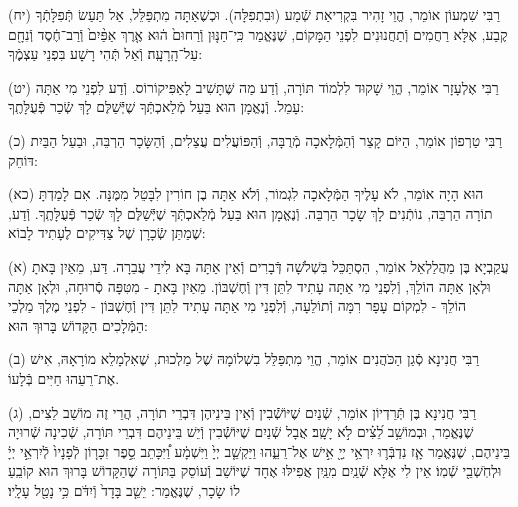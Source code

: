 \documentclass[twoside, openany, parskip=half, 11pt]{book}
\begin{document}
(יח)
רַבִּי שִׁמְעוֹן אוֹמֵר, הֱוֵי זָהִיר בִּקְרִיאַת שְֿׁמַע (וּבִתְפִלָּה). וּכְשֶׁאַתָּה מִתְפַּלֵּל, אַל תַּעַשׂ תְּֿפִלָּתְֿךָ קֶבַע, אֶלָּא רַחֲמִים וְֿתַחֲנוּנִים לִפְנֵי הַמָּקוֹם, שֶׁנֶּאֱמַר כִּֽי־חַנּ֤וּן וְֿרַחוּם֙ ה֔וּא אֶ֤רֶךְ אַפַּ֨יִם֙ וְֿרַב־חֶ֔סֶד וְֿנִחָ֖ם עַל־הָֽרָעָֽה׃ וְֿאַל תְּֿהִי רָשָׁע בִּפְנֵי עַצְמֶֽֿךָ:

(יט)
רַבִּי אֶלְעָזָר אוֹמֵר, הֱוֵי שָׁקוּד לִלְמוֹד תּוֹרָה, וְֿדַע מַה שֶּׁתָּשִׁיב לָאַפִּיקוֹרוֹס. וְֿדַע לִפְנֵי מִי אַתָּה עָמֵל. וְֿנֶאֱמָן הוּא בַּעַל מְֿלַאכְתְּֿךָ שֶׁיְּֿֿשַׁלֶּם לָךְ שְֿׂכַר פְּֿעֻלָּתֶֽךָ:


(כ)
רַבִּי טַרְפוֹן אוֹמֵר, הַיּוֹם קָצֵר וְֿהַמְּֿלָאכָה מְֿרֻבָּה, וְֿהַפּוֹעֲלִים עֲצֵלִים, וְֿהַשָּׂכָר הַרְבֵּה, וּבַעַל הַבַּיִת דּוֹחֵק:

(כא) הוּא הָיָה אוֹמֵר, לֹא עָלֶיךָ הַמְּֿלָאכָה לִגְמוֹר, וְֿלֹא אַתָּה בֶן חוֹרִין לִבָּטֵל מִמֶּנָּה. אִם לָמַדְתָּ תוֹרָה הַרְבֵּה, נוֹתְֿנִים לָךְ שָׂכָר הַרְבֵּה. וְֿנֶאֱמָן הוּא בַּעַל מְֿלַאכְתְּֿךָ שֶׁיְּֿֿשַׁלֶּם לָךְ שְֿׂכַר פְּֿעֻלָּתֶֽךָ. וְֿדַע, שֶׁמַתַּן שְֿׂכָרָן שֶׁל צַדִּיקִים לֶעָתִיד לָבוֹא:


\kolyisroel

(א)
עֲקַבְיָא בֶּן מַהֲלַלְאֵל אוֹמֵר, הִסְתַּכֵּל בִּשְׁלֹשָׁה דְּֿבָרִים וְֿאֵין אַתָּה בָּא לִידֵי עֲבֵרָה. דַּע, מֵאַיִן בָּאתָ וּלְאָן אַתָּה הוֹלֵךְ, וְֿלִפְנֵי מִי אַתָּה עָתִיד לִתֵּן דִּין וְֿחֶשְׁבּוֹן.
מֵאַיִן בָּאתָ - מִטִּפָּה סְֿרוּחָה,
וּלְאָן אַתָּה הוֹלֵךְ - לִמְקוֹם עָפָר רִמָּה וְֿתוֹלֵעָה,
וְֿלִפְנֵי מִי אַתָּה עָתִיד לִתֵּן דִּין וְֿחֶשְׁבּוֹן - לִפְנֵי מֶלֶךְ מַלְכֵי הַמְּֿלָכִים הַקָּדוֹשׁ בָּרוּךְ הוּא:

(ב)
רַבִּי חֲנִינָא סְֿגַן הַכֹּהֲנִים אוֹמֵר, הֱוֵי מִתְפַּלֵּל בִשְׁלוֹמָהּ שֶׁל מַלְכוּת, שֶׁאִלְמָלֵא מוֹרָאָהּ, אִישׁ אֶת־רֵעֵהוּ חַיִּים בְּֿלָעוֹ.

(ג)
רַבִּי חֲנִינָא בֶּן תְּֿרַדְיוֹן אוֹמֵר, שְֿׁנַיִם שֶׁיּוֹשְֿֿׁבִין וְֿאֵין בֵּינֵיהֶן דִּבְרֵי תוֹרָה, הֲרֵי זֶה מוֹשַׁב לֵצִים, שֶׁנֶּאֱמַר,  וּבְמוֹשַׁ֥ב לֵ֝צִ֗ים לֹ֣א יָשָֽׁב׃
אֲבָל שְֿׁנַיִם שֶׁיּוֹשְֿֿׁבִין וְֿיֵשׁ בֵּינֵיהֶם דִּבְרֵי תּוֹרָה, שְֿׁכִינָה שְֿׁרוּיָה בֵּינֵיהֶם, שֶׁנֶּאֱמַר אָ֧ז נִדְבְּֿר֛וּ יִרְאֵ֥י יְיָ֖ אִ֣ישׁ אֶל־רֵעֵ֑הוּ וַיַּקְשֵׁ֤ב יְיָ֙ וַיִּשְׁמָ֔ע וַ֠יִּכָּתֵב סֵ֣פֶר זִכָּר֤וֹן לְֿפָנָיו֙ לְֿיִרְאֵ֣י יְיָ֔ וּלְחֹֽשְׁבֵ֖י שְֿׁמֽוֹ׃ אֵין לִי אֶלָּא שְֿׁנַֽיִם מִנַּֽיִן אֲפִילּוּ אֶחָד שֶׁיּוֹשֵׁב וְֿעוֹסֵק בַּתּוֹרָה שֶׁהַקָּדוֹשׁ בָּרוּךְ הוּא קוֹבֵֽעַ לוֹ שָׂכָר, שֶׁנֶּאֱמַר: יֵשֵׁ֤ב בָּדָד֙ וְֿיִדֹּ֔ם כִּ֥י נָטַ֖ל עָלָֽיו׃
\end{document}
